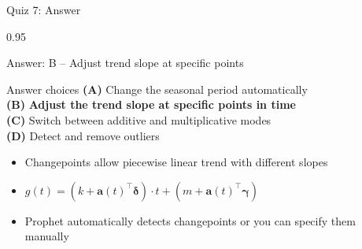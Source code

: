\documentclass[9pt, aspectratio=169, t]{beamer}
\begin{document}
\begin{frame}{Quiz 7: Answer}
    \begin{cminipage}{0.95\textwidth}
    \begin{exampleblock}{Answer: B -- Adjust trend slope at specific points}

    \begin{block}{Answer choices}
        \textcolor{MainBlue}{\textbf{(A)}} Change the seasonal period automatically \incorrect\\[3pt]
        \textcolor{MainBlue}{\textbf{(B)}} \textbf{\textcolor{Forest}{Adjust the trend slope at specific points in time}} \correct\\[3pt]
        \textcolor{MainBlue}{\textbf{(C)}} Switch between additive and multiplicative modes \incorrect\\[3pt]
        \textcolor{MainBlue}{\textbf{(D)}} Detect and remove outliers \incorrect
    \end{block}

        \vspace{0.3cm}

        \begin{itemize}
            \item Changepoints allow piecewise linear trend with different slopes
            \item $g(t) = (k + \mathbf{a}(t)^\top \boldsymbol{\delta}) \cdot t + (m + \mathbf{a}(t)^\top \boldsymbol{\gamma})$
            \item Prophet automatically detects changepoints or you can specify them manually
        \end{itemize}
    \end{exampleblock}

    \end{cminipage}
\end{frame}
\end{document}

